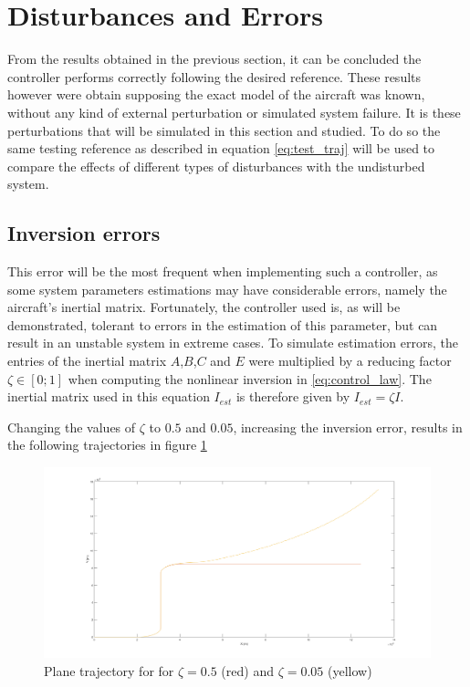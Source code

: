 \section{Disturbances and Errors}
\label{section:results/disturbances_errors}

From the results obtained in the previous section, it can be concluded the controller performs correctly following the desired reference. These results however were obtain supposing the exact model of the aircraft was known, without any kind of external perturbation or simulated system failure. It is these perturbations that will be simulated in this section and studied. To do so the same testing reference as described in equation \ref{eq:test_traj} will be used to compare the effects of different types of disturbances with the undisturbed system. 

\subsection{Inversion errors}

This error will be the most frequent when implementing such a controller, as some system parameters estimations may have considerable errors, namely the aircraft's inertial matrix. Fortunately, the controller used is, as will be demonstrated, tolerant to errors in the estimation of this parameter, but can result in an unstable system in extreme cases. To simulate estimation errors, the entries of the inertial matrix $A$,$B$,$C$ and $E$ were multiplied by a reducing factor $\zeta \in [0;1]$ when computing the nonlinear inversion in \ref{eq:control_law}. The inertial matrix used in this equation $I_{est}$ is therefore given by $I_{est} = \zeta I$.

Changing the values of $\zeta$ to $0.5$ and $0.05$, increasing the inversion error, results in the following trajectories in figure \ref{fig:inversion_error}

\begin{figure}[H]
\centering
\includegraphics[width=\textwidth]{Figures/Results/inversion_error.png}
\caption[Plane trajectory with inertia estimation errors]{Plane trajectory for for $\zeta = 0.5$ (red) and $\zeta= 0.05$ (yellow)}
\label{fig:inversion_error}
\end{figure}

